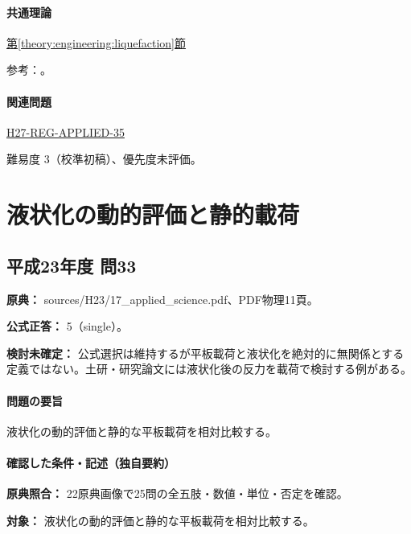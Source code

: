 \paragraph{共通理論} \hyperref[theory:engineering:liquefaction]{第\ref*{theory:engineering:liquefaction}節}

\par 参考：\cite{eng52_liquefaction,eng52_liq_sorting}。

\paragraph{関連問題} \hyperref[q:h27-reg-applied-35]{H27-REG-APPLIED-35}

\par 難易度 3（校準初稿）、優先度未評価。

\section{液状化の動的評価と静的載荷}

\subsection{平成23年度 問33}
\label{q:h23-reg-applied-33}

\noindent\textbf{原典：} sources/H23/17\_applied\_science.pdf、PDF物理11頁。

\textbf{公式正答：} 5（single）。

\par\textbf{検討未確定：} 公式選択は維持するが平板載荷と液状化を絶対的に無関係とする定義ではない。土研・研究論文には液状化後の反力を載荷で検討する例がある。

\paragraph{問題の要旨} 液状化の動的評価と静的な平板載荷を相対比較する。

\paragraph{確認した条件・記述（独自要約）}\mbox{}\par

\noindent\textbf{原典照合：} 22原典画像で25問の全五肢・数値・単位・否定を確認。\par

\noindent\textbf{対象：} 液状化の動的評価と静的な平板載荷を相対比較する。\par

